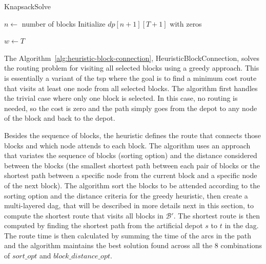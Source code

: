 \begin{algorithm}[h!]
	\caption{KnapsackSolve}
	\SetAlgoLined

	$n \leftarrow$ number of blocks\;
	Initialize $dp[n+1][T+1]$ with zeros\;


	$w \leftarrow T$\;

	\;
\end{algorithm}

The Algorithm~\ref{alg:heuristic-block-connection}, HeuristicBlockConnection, solves the routing problem for visiting all selected blocks using a greedy approach. This is essentially a variant of the \gls{tsp} where the goal is to find a minimum cost route that visits at least one node from all selected blocks. The algorithm first handles the trivial case where only one block is selected. In this case, no routing is needed, so the cost is zero and the path simply goes from the depot to any node of the block and back to the depot.

Besides the sequence of blocks, the heuristic defines the route that connects those blocks and which node attends to each block. The algorithm uses an approach that variates the sequence of blocks (sorting option) and the distance considered between the blocks (the smallest shortest path between each pair of blocks or the shortest path between a specific node from the current block and a specific node of the next block). The algorithm sort the blocks to be attended according to the sorting option and the distance criteria for the greedy heuristic, then create a multi-layered \gls{dag}, that will be described in more details next in this section, to compute the shortest route that visits all blocks in $\mathcal{B}'$. The shortest route is then computed by finding the shortest path from the artificial depot $s$ to $t$ in the \gls{dag}. The route time is then calculated by summing the time of the arcs in the path and the algorithm maintains the best solution found across all the 8 combinations of $sort\_opt$ and $block\_distance\_opt$.

